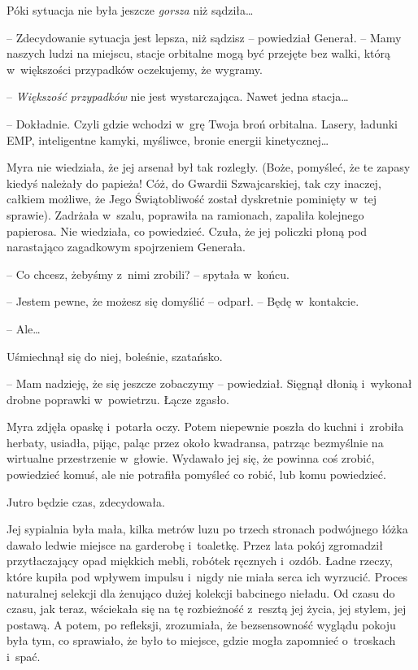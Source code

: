 \documentclass[oneside,polish,11pt,sfheadings]{mwbk}
\begin{document}
Póki sytuacja nie była jeszcze \textit{gorsza} niż sądziła\ldots

-- Zdecydowanie sytuacja jest lepsza, niż sądzisz -- powiedział Generał. -- Mamy naszych ludzi na miejscu, stacje orbitalne mogą być przejęte bez
walki, którą w~większości przypadków oczekujemy, że wygramy.

-- \textit{Większość przypadków} nie jest wystarczająca. Nawet jedna
stacja\ldots

-- Dokładnie. Czyli gdzie wchodzi w~grę Twoja broń orbitalna. Lasery,
ładunki EMP, inteligentne kamyki, myśliwce, bronie energii
kinetycznej\ldots

Myra nie wiedziała, że jej arsenał był tak rozległy. (Boże, pomyśleć, że
te zapasy kiedyś należały do papieża! Cóż, do Gwardii Szwajcarskiej, tak
czy inaczej, całkiem możliwe, że Jego Świątobliwość został dyskretnie
pominięty w~tej sprawie). Zadrżała w~szalu, poprawiła na ramionach,
zapaliła kolejnego papierosa. Nie wiedziała, co powiedzieć. Czuła, że
jej policzki płoną pod narastająco zagadkowym spojrzeniem Generała.

-- Co chcesz, żebyśmy z~nimi zrobili? -- spytała w~końcu.

-- Jestem pewne, że możesz się domyślić -- odparł. -- Będę w~kontakcie.

-- Ale\ldots

Uśmiechnął się do niej, boleśnie, szatańsko.

-- Mam nadzieję, że się jeszcze zobaczymy -- powiedział. Sięgnął dłonią i~wykonał drobne poprawki w~powietrzu. Łącze zgasło.

Myra zdjęła opaskę i~potarła oczy. Potem niepewnie poszła do kuchni i~zrobiła herbaty, usiadła, pijąc, paląc przez około kwadransa, patrząc
bezmyślnie na wirtualne przestrzenie w~głowie. Wydawało jej się, że
powinna coś zrobić, powiedzieć komuś, ale nie potrafiła pomyśleć co
robić, lub komu powiedzieć.

Jutro będzie czas, zdecydowała.

Jej sypialnia była mała, kilka metrów luzu po trzech stronach podwójnego
łóżka dawało ledwie miejsce na garderobę i~toaletkę. Przez lata pokój
zgromadził przytłaczający opad miękkich mebli, robótek ręcznych i~ozdób.
Ładne rzeczy, które kupiła pod wpływem impulsu i~nigdy nie miała serca
ich wyrzucić. Proces naturalnej selekcji dla żenująco dużej kolekcji
babcinego nieładu. Od czasu do czasu, jak teraz, wściekała się na tę
rozbieżność z~resztą jej życia, jej stylem, jej postawą. A potem, po
refleksji, zrozumiała, że bezsensowność wyglądu pokoju była tym, co
sprawiało, że było to miejsce, gdzie mogła zapomnieć o~troskach i~spać.
\end{document}
